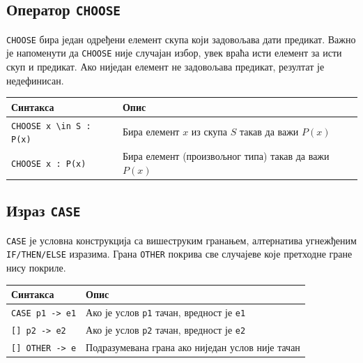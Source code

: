 \subsection{Оператор \texttt{CHOOSE}}
\texttt{CHOOSE} бира један одређени елемент скупа који задовољава дати предикат.
Важно је напоменути да \texttt{CHOOSE} није случајан избор, увек враћа исти елемент за исти скуп и предикат.
Ако ниједан елемент не задовољава предикат, резултат је недефинисан.
\begin{center}
\begin{tabularx}{\textwidth}{|l|X|}
\hline
\textbf{Синтакса} & \textbf{Опис} \\
\hline
\texttt{CHOOSE x \textbackslash in S : P(x)} & Бира елемент $x$ из скупа $S$ такав да важи $P(x)$ \\
\texttt{CHOOSE x : P(x)}                     & Бира елемент (произвољног типа) такав да важи $P(x)$ \\
\hline
\end{tabularx}
\end{center}

\subsection{Израз \texttt{CASE}}
\texttt{CASE} је условна конструкција са вишеструким гранањем, алтернатива угнежђеним \texttt{IF/THEN/ELSE} изразима.
Грана \texttt{OTHER} покрива све случајеве које претходне гране нису покриле.
\begin{center}
\begin{tabularx}{\textwidth}{|l|X|}
\hline
\textbf{Синтакса} & \textbf{Опис} \\
\hline
\texttt{CASE p1 -> e1}          & Ако је услов \texttt{p1} тачан, вредност је \texttt{e1} \\
\texttt{[] p2 -> e2}            & Ако је услов \texttt{p2} тачан, вредност је \texttt{e2} \\
\texttt{[] OTHER -> e}          & Подразумевана грана ако ниједан услов није тачан \\
\hline
\end{tabularx}
\end{center}

